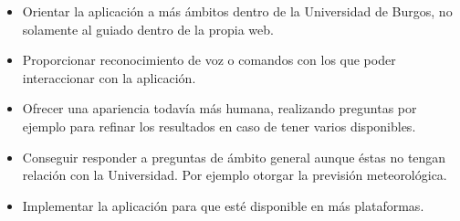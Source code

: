 \begin{itemize}
\tightlist
\item
Orientar la aplicación a más ámbitos dentro de la Universidad de Burgos, no solamente al guiado dentro de la propia web.
\item
Proporcionar reconocimiento de voz o comandos con los que poder interaccionar con la aplicación.
\item
Ofrecer una apariencia todavía más humana, realizando preguntas por ejemplo para refinar los resultados en caso de tener varios disponibles.
\item
Conseguir responder a preguntas de ámbito general aunque éstas no tengan relación con la Universidad. Por ejemplo otorgar la previsión meteorológica.
\item
Implementar la aplicación para que esté disponible en más plataformas.
\end{itemize}